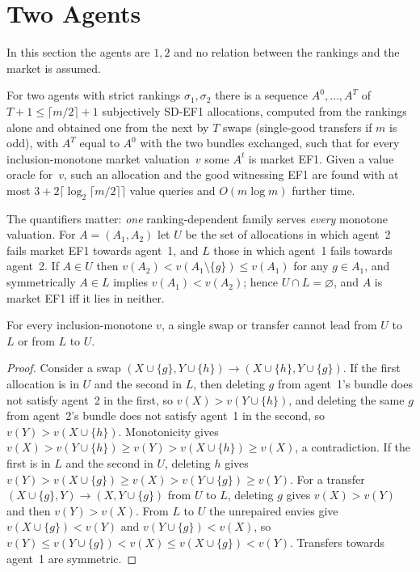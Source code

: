 \documentclass[sigconf,anonymous]{aamas}
\begin{document}
\section{Two Agents}\label{sec:two}
In this section the agents are $1,2$ and no relation between the rankings and the market is assumed.

\begin{theorem}\label{thm:two}
For two agents with strict rankings $\sigma_1,\sigma_2$ there is a sequence $A^0,\dots,A^T$ of $T+1\le\lceil m/2\rceil+1$ subjectively SD-EF1 allocations, computed from the rankings alone and obtained one from the next by $T$ swaps (single-good transfers if $m$ is odd), with $A^T$ equal to $A^0$ with the two bundles exchanged, such that for every inclusion-monotone market valuation~$v$ some $A^t$ is market EF1. Given a value oracle for~$v$, such an allocation and the good witnessing EF1 are found with at most $3+2\lceil\log_2\lceil m/2\rceil\rceil$ value queries and $O(m\log m)$ further time.
\end{theorem}

The quantifiers matter: \emph{one} ranking-dependent family serves \emph{every} monotone valuation. For $A=(A_1,A_2)$ let $U$ be the set of allocations in which agent~2 fails market EF1 towards agent~1, and $L$ those in which agent~1 fails towards agent~2. If $A\in U$ then $v(A_2)<v(A_1\setminus\{g\})\le v(A_1)$ for any $g\in A_1$, and symmetrically $A\in L$ implies $v(A_1)<v(A_2)$; hence $U\cap L=\varnothing$, and $A$ is market EF1 iff it lies in neither.

\begin{lemma}[No jump]\label{lem:jump}
For every inclusion-monotone $v$, a single swap or transfer cannot lead from $U$ to $L$ or from $L$ to $U$.
\end{lemma}
\begin{proof}
Consider a swap $(X\cup\{g\},Y\cup\{h\})\to(X\cup\{h\},Y\cup\{g\})$. If the first allocation is in $U$ and the second in $L$, then deleting $g$ from agent~1's bundle does not satisfy agent~2 in the first, so $v(X)>v(Y\cup\{h\})$, and deleting the same $g$ from agent~2's bundle does not satisfy agent~1 in the second, so $v(Y)>v(X\cup\{h\})$. Monotonicity gives $v(X)>v(Y\cup\{h\})\ge v(Y)>v(X\cup\{h\})\ge v(X)$, a contradiction. If the first is in $L$ and the second in $U$, deleting $h$ gives $v(Y)>v(X\cup\{g\})\ge v(X)>v(Y\cup\{g\})\ge v(Y)$. For a transfer $(X\cup\{g\},Y)\to(X,Y\cup\{g\})$ from $U$ to $L$, deleting $g$ gives $v(X)>v(Y)$ and then $v(Y)>v(X)$. From $L$ to $U$ the unrepaired envies give $v(X\cup\{g\})<v(Y)$ and $v(Y\cup\{g\})<v(X)$, so $v(Y)\le v(Y\cup\{g\})<v(X)\le v(X\cup\{g\})<v(Y)$. Transfers towards agent~1 are symmetric.
\end{proof}
\end{document}
